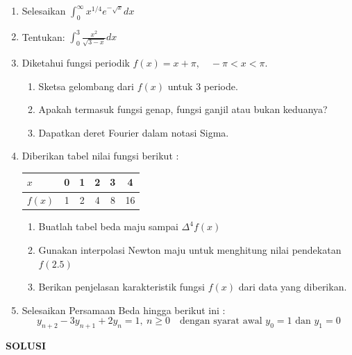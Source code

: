 \documentclass[11pt,letterpaper]{article}
\begin{document}
\begin{enumerate}
  \item Selesaikan $\displaystyle\int_{0}^{\infty} x^{1/4} e^{-\sqrt{x}} dx$
  \item Tentukan: $\displaystyle\int_{0}^{3} \frac{x^2}{\sqrt{3-x}} dx$
  \item Diketahui fungsi periodik $f(x) = x + \pi, \quad -\pi < x < \pi$.
        \begin{enumerate}[label=\alph*)]
          \item Sketsa gelombang dari $f(x)$ untuk 3 periode.
          \item Apakah termasuk fungsi genap, fungsi ganjil atau bukan keduanya?
          \item Dapatkan deret Fourier dalam notasi Sigma.
        \end{enumerate}
  \item Diberikan tabel nilai fungsi berikut :
        \begin{center}
          \begin{tabular}{|l|c|c|c|c|c|}
            \hline
            $x$    & 0 & 1 & 2 & 3 & 4  \\ \hline
            $f(x)$ & 1 & 2 & 4 & 8 & 16 \\ \hline
          \end{tabular}
        \end{center}
        \begin{enumerate}[label=\alph*.]
          \item Buatlah tabel beda maju sampai $\Delta^4 f(x)$
          \item Gunakan interpolasi Newton maju untuk menghitung nilai pendekatan $f(2.5)$
          \item Berikan penjelasan karakteristik fungsi $f(x)$ dari data yang diberikan.
        \end{enumerate}
  \item Selesaikan Persamaan Beda hingga berikut ini :
        \[ y_{n+2} - 3y_{n+1} + 2y_n = 1, \ n \ge 0 \quad \text{dengan syarat awal } y_0 = 1 \text{ dan } y_1 = 0 \]
\end{enumerate}

\newpage
\begin{center}
  \textbf{SOLUSI}
\end{center}
\end{document}
